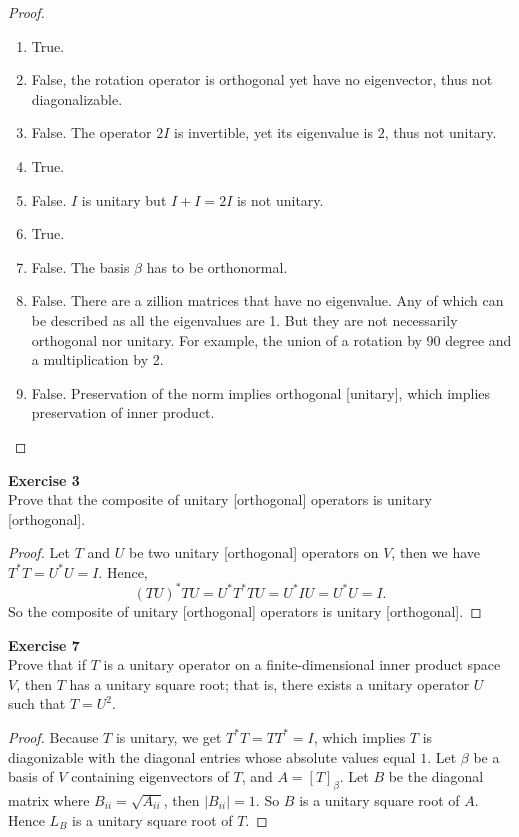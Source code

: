 \documentclass[12pt, a4paper]{article}
\theoremstyle{plain}
\newenvironment{exercise}[2][Exercise]
    { \begin{mdframed}[backgroundcolor=gray!20] \textbf{#1 #2} \\}
    {  \end{mdframed}}
\begin{document}
	\begin{proof}
	\hfill
	\begin{enumerate}[label=(\alph*)]
	\item True.
	\item False, the rotation operator is orthogonal yet have no eigenvector, thus not diagonalizable.
	\item False. The operator $2I$ is invertible, yet its eigenvalue is $2$, thus not unitary.
	\item True.
	\item False. $I$ is unitary but $I+I = 2I$ is not unitary.
	\item True.
	\item False. The basis $\beta$ has to be orthonormal.
	\item False. There are a zillion matrices that have no eigenvalue. Any of which can be described as all the eigenvalues are 1. But they are not necessarily orthogonal nor unitary. For example, the union of a rotation by 90 degree and a multiplication by 2.
	\item False. Preservation of the norm implies orthogonal [unitary], which implies preservation of inner product.
	\end{enumerate}
	\end{proof}
	
\begin{exercise}{3}
Prove that the composite of unitary [orthogonal] operators is unitary [orthogonal].
\end{exercise}
	\begin{proof}
	Let $T$ and $U$ be two unitary [orthogonal] operators on $V$, then we have $T^*T = U^*U = I$. Hence, 
	\[
	(TU)^*TU = U^*T^*TU = U^*IU = U^*U =I.
	\]
	So the composite of unitary [orthogonal] operators is unitary [orthogonal].
	\end{proof}

\begin{exercise}{7}
Prove that if $T$ is a unitary operator on a finite-dimensional inner product space $V$, then $T$ has a unitary square root; that is, there exists a unitary operator $U$ such that $T=U^2$.
\end{exercise}
	\begin{proof}
	Because $T$ is unitary, we get $T^*T = TT^* = I$, which implies $T$ is diagonizable with the diagonal entries whose absolute values equal $1$. Let $\beta$ be a basis of $V$ containing eigenvectors of $T$, and $A=[T]_\beta$. Let $B$ be the diagonal matrix where $B_{ii} = \sqrt{A_{ii}}$, then $|B_{ii}|=1$. So $B$ is a unitary square root of $A$. Hence $L_B$ is a unitary square root of $T$.
	\end{proof}
\end{document}
